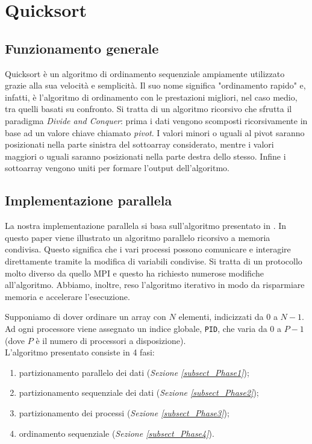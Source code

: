 \chapter{Quicksort}
\section{Funzionamento generale}
Quicksort è un algoritmo di ordinamento sequenziale ampiamente utilizzato grazie alla sua velocità e semplicità. Il suo nome significa "ordinamento rapido" e, infatti, è l'algoritmo di ordinamento con le prestazioni migliori, nel caso medio, tra quelli basati su confronto.
Si tratta di un algoritmo ricorsivo che sfrutta il paradigma \textit{Divide and Conquer}: prima i dati vengono scomposti ricorsivamente in base ad un valore chiave chiamato \textit{pivot}. I valori minori o uguali al pivot saranno posizionati nella parte sinistra del sottoarray considerato, mentre i valori maggiori o uguali saranno posizionati nella parte destra dello stesso. Infine i sottoarray vengono uniti per formare l'output dell'algoritmo. \\

\section{Implementazione parallela}
La nostra implementazione parallela si basa sull'algoritmo presentato in \cite{PaperQuickSort}. In questo paper viene illustrato un algoritmo parallelo ricorsivo a memoria condivisa. Questo significa che i vari processi possono comunicare e interagire direttamente tramite la modifica di variabili condivise. Si tratta di un protocollo molto diverso da quello MPI e questo ha richiesto numerose modifiche all'algoritmo. Abbiamo, inoltre, reso l'algoritmo iterativo in modo da risparmiare memoria e accelerare l'esecuzione.

Supponiamo di dover ordinare un array con $N$ elementi, indicizzati da $0$ a $N-1$. Ad ogni processore viene assegnato un indice globale, \texttt{PID}, che varia da $0$ a $P-1$ (dove $P$ è il numero di processori a disposizione).\\
L'algoritmo presentato consiste in 4 fasi:
\begin{enumerate}
\item partizionamento parallelo dei dati (\textit{Sezione \ref{subsect_Phase1}});
\item partizionamento sequenziale dei dati (\textit{Sezione \ref{subsect_Phase2}});
\item partizionamento dei processi (\textit{Sezione \ref{subsect_Phase3}});
\item ordinamento sequenziale (\textit{Sezione \ref{subsect_Phase4}}).
\end{enumerate}
 
